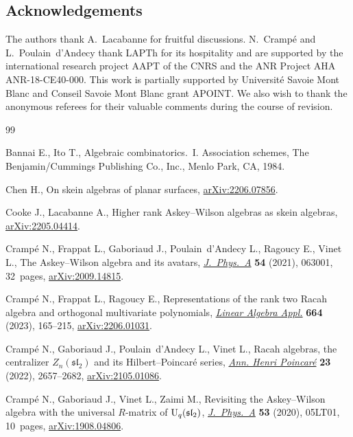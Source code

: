\documentclass[10pt,a4paper]{amsart}
\numberwithin{equation}{section}
\theoremstyle{definition}
\begin{document}
\subsection*{Acknowledgements} The authors thank A.~Lacabanne for fruitful discussions.
N.~Cramp\'e and L.~Poulain~d'Andecy thank LAPTh for its hospitality and are supported by the international research project AAPT of the CNRS and the ANR Project AHA ANR-18-CE40-000.
This work is partially supported by Universit\'e Savoie Mont Blanc and Conseil Savoie Mont Blanc grant APOINT.
We also wish to thank the anonymous referees for their valuable comments during the course of revision.




\begin{thebibliography}{99}
\footnotesize\itemsep=0pt

Bannai E., Ito T., Algebraic combinatorics.~{I}. Association schemes, The
 Benjamin/Cummings Publishing Co., Inc., Menlo Park, CA, 1984.

Chen H., On skein algebras of planar surfaces, \href{https://arxiv.org/abs/2206.07856}{arXiv:2206.07856}.

Cooke J., Lacabanne A., Higher rank {A}skey--{W}ilson algebras as skein
 algebras, \href{https://arxiv.org/abs/2205.04414}{arXiv:2205.04414}.

Cramp\'e N., Frappat L., Gaboriaud J., Poulain~d'Andecy L., Ragoucy E., Vinet L., The
 {A}skey--{W}ilson algebra and its avatars, \href{https://doi.org/10.1088/1751-8121/abd783}{\textit{J.~Phys.~A}} \textbf{54}
 (2021), 063001, 32~pages, \href{https://arxiv.org/abs/2009.14815}{arXiv:2009.14815}.

Cramp\'e N., Frappat L., Ragoucy E., Representations of the rank two {R}acah
 algebra and orthogonal multivariate polynomials, \href{https://doi.org/10.1016/j.laa.2023.01.017}{\textit{Linear Algebra
 Appl.}} \textbf{664} (2023), 165--215, \href{https://arxiv.org/abs/2206.01031}{arXiv:2206.01031}.

Cramp\'e N., Gaboriaud J., Poulain~d'Andecy L., Vinet L., Racah algebras, the
 centralizer {$Z_n(\mathfrak{sl}_2)$} and its {H}ilbert--{P}oincar\'e series,
 \href{https://doi.org/10.1007/s00023-021-01152-y}{\textit{Ann. Henri Poincar\'e}} \textbf{23} (2022), 2657--2682,
 \href{https://arxiv.org/abs/2105.01086}{arXiv:2105.01086}.

Cramp\'e N., Gaboriaud J., Vinet L., Zaimi M., Revisiting the {A}skey--{W}ilson
 algebra with the universal {$R$}-matrix of {${\rm U}_q(\mathfrak{sl}_2)$},
 \href{https://doi.org/10.1088/1751-8121/ab604e}{\textit{J.~Phys.~A}} \textbf{53} (2020), 05LT01, 10~pages,
 \href{https://arxiv.org/abs/1908.04806}{arXiv:1908.04806}.


\end{thebibliography}
\end{document}
